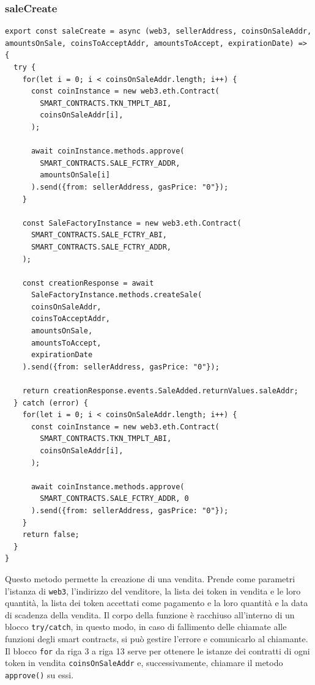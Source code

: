 \documentclass[a4paper]{article}
\begin{document}
        \subsubsection{saleCreate}
        \begin{lstlisting}[style=ES6, title={Funzione saleCreate()}]
export const saleCreate = async (web3, sellerAddress, coinsOnSaleAddr, amountsOnSale, coinsToAcceptAddr, amountsToAccept, expirationDate) => {
  try {
    for(let i = 0; i < coinsOnSaleAddr.length; i++) {
      const coinInstance = new web3.eth.Contract(
        SMART_CONTRACTS.TKN_TMPLT_ABI,
        coinsOnSaleAddr[i],
      );

      await coinInstance.methods.approve(
        SMART_CONTRACTS.SALE_FCTRY_ADDR,
        amountsOnSale[i]
      ).send({from: sellerAddress, gasPrice: "0"});
    }

    const SaleFactoryInstance = new web3.eth.Contract(
      SMART_CONTRACTS.SALE_FCTRY_ABI,
      SMART_CONTRACTS.SALE_FCTRY_ADDR,
    );

    const creationResponse = await 
      SaleFactoryInstance.methods.createSale(
      coinsOnSaleAddr,
      coinsToAcceptAddr,
      amountsOnSale,
      amountsToAccept,
      expirationDate
    ).send({from: sellerAddress, gasPrice: "0"});

    return creationResponse.events.SaleAdded.returnValues.saleAddr;
  } catch (error) {
    for(let i = 0; i < coinsOnSaleAddr.length; i++) {
      const coinInstance = new web3.eth.Contract(
        SMART_CONTRACTS.TKN_TMPLT_ABI,
        coinsOnSaleAddr[i],
      );

      await coinInstance.methods.approve(
        SMART_CONTRACTS.SALE_FCTRY_ADDR, 0
      ).send({from: sellerAddress, gasPrice: "0"});
    }
    return false;
  }
}\end{lstlisting}
        Questo metodo permette la creazione di una vendita. Prende come parametri l'istanza di \verb|web3|, l'indirizzo del venditore, la lista dei token in vendita e le loro quantità,
        la lista dei token accettati come pagamento e la loro quantità e la data di scadenza della vendita.
        \newline
        Il corpo della funzione è racchiuso all'interno di un blocco \verb|try/catch|, in questo modo, in caso di fallimento delle chiamate alle funzioni degli smart contracts, si può gestire l'errore e comunicarlo al chiamante.
        \newline
        Il blocco \verb|for| da riga 3 a riga 13 serve per ottenere le istanze dei contratti di ogni token in vendita \verb|coinsOnSaleAddr| e, successivamente, chiamare il metodo \verb|approve()| su essi.
\end{document}
